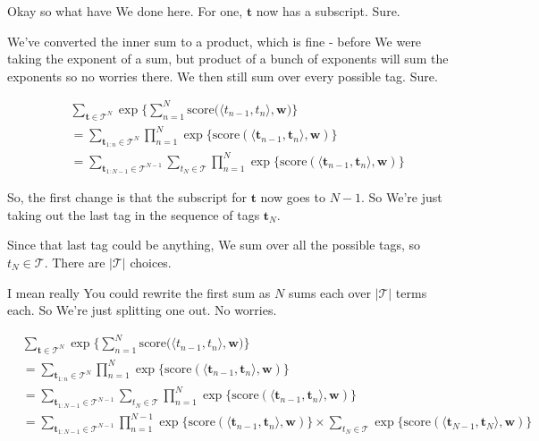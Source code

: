 \documentclass{article}
\begin{document}
	Okay so what have We done here. For one, $\mathbf{t}$ now has a subscript. Sure.
	
	We've converted the inner sum to a product, which is fine - before We were taking the exponent of a sum, but product of a bunch of exponents will sum the exponents so no worries there. We then still sum over every possible tag. Sure. 
	
	\begin{align}
		&\sum_{\mathbf{t}\in\mathcal{T}^N} \exp\bigg\{ \sum^N_{n=1} \text{score}\big( \langle t_{n-1}, t_n \rangle, \mathbf{w} \big) \bigg\}\\
		&= \sum_{\mathbf{t}_{1:n}\in\mathcal{T}^N} \prod^N_{n=1} \exp \big\{ \text{score}(\langle \mathbf{t}_{n-1}, \mathbf{t}_n \rangle, \mathbf{w}) \big\}\\
		&= \sum_{\mathbf{t}_{1:N-1}\in\mathcal{T}^{N-1}} \sum_{t_N\in \mathcal{T}} \prod^N_{n=1} \exp \big\{ \text{score}(\langle \mathbf{t}_{n-1}, \mathbf{t}_n \rangle, \mathbf{w}) \big\}
	\end{align}	
	
	So, the first change is that the subscript for $\mathbf{t}$ now goes to $N-1$. So We're just taking out the last tag in the sequence of tags $\mathbf{t}_N$.
	
	Since that last tag could be anything, We sum over all the possible tags, so $t_N\in\mathcal{T}$. There are $|\mathcal{T}|$ choices.
	
	I mean really You could rewrite the first sum as $N$ sums each over $|\mathcal{T}|$ terms each. So We're just splitting one out. No worries.
	
	\begin{align}
		&\sum_{\mathbf{t}\in\mathcal{T}^N} \exp\bigg\{ \sum^N_{n=1} \text{score}\big( \langle t_{n-1}, t_n \rangle, \mathbf{w} \big) \bigg\}\\
		&= \sum_{\mathbf{t}_{1:n}\in\mathcal{T}^N} \prod^N_{n=1} \exp \big\{ \text{score}(\langle \mathbf{t}_{n-1}, \mathbf{t}_n \rangle, \mathbf{w}) \big\}\\
		&= \sum_{\mathbf{t}_{1:N-1}\in\mathcal{T}^{N-1}} \sum_{t_N\in \mathcal{T}} \prod^N_{n=1} \exp \big\{ \text{score}(\langle \mathbf{t}_{n-1}, \mathbf{t}_n \rangle, \mathbf{w}) \big\}\\
		&= \sum_{\mathbf{t}_{1:N-1}\in\mathcal{T}^{N-1}} \prod^{N-1}_{n=1} \exp \big\{ \text{score}(\langle \mathbf{t}_{n-1}, \mathbf{t}_n \rangle, \mathbf{w}) \big\} \times \sum_{t_N\in\mathcal{T}} \exp \big\{ \text{score}(\langle \mathbf{t}_{N-1}, \mathbf{t}_N \rangle, \mathbf{w}) \big\}
	\end{align}	
	
\end{document}
